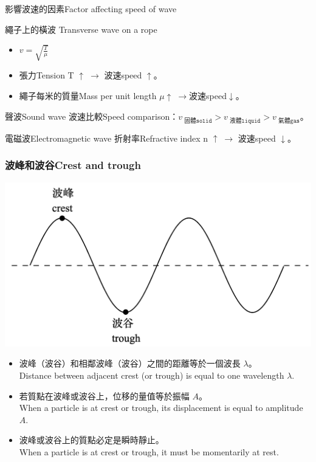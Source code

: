 \documentclass[beamer=true]{standalone}
\begin{document}
\begin{frame}{影響波速的因素Factor affecting speed of wave}

    \begin{exampleblock}{繩子上的橫波 Transverse wave on a rope}
        \begin{itemize}
            \setlength{\itemsep}{.6em}
            \item $\displaystyle v=\sqrt{\frac{T}{\mu}} $
            \item 張力Tension T $\uparrow \;\rightarrow$ 波速speed $\uparrow$。
            \item 繩子每米的質量Mass per unit length $\mu\uparrow \;\rightarrow$波速speed$\downarrow$。
        \end{itemize}
    \end{exampleblock}
    \begin{exampleblock}{聲波Sound wave}
        波速比較Speed comparison：$v_{\texttt{ 固體solid}}>v_{\texttt{ 液體liquid}}>v_{\texttt{ 氣體gas}}$。
    \end{exampleblock}

    \begin{exampleblock}{電磁波Electromagnetic wave}
        折射率Refractive index n $\uparrow \;\rightarrow$ 波速speed $\downarrow$。
    \end{exampleblock}
\end{frame}

\begin{frame}
    \frametitle{波峰和波谷Crest and trough}
    \par{\par\centering\includegraphics[width=.7\textwidth]{./img/ch1_2024-05-09-11-41-18.png}\par}
    \begin{itemize}
        \item 波峰（波谷）和相鄰波峰（波谷）之間的距離等於一個波長 $\lambda$。\\Distance between adjacent crest (or trough) is equal to one wavelength $\lambda$.
        \item 若質點在波峰或波谷上，位移的量值等於振幅 $A$。\\When a particle is at crest or trough, its displacement is equal to amplitude $A$.
        \item 波峰或波谷上的質點必定是瞬時靜止。\\When a particle is at crest or trough, it must be momentarily at rest.
    \end{itemize}
\end{frame}
\end{document}

